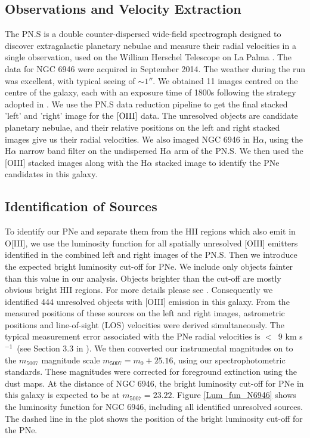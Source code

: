 \documentclass[fleqn,usenatbib]{mnras}
\newcommand{\kms}{km s$^{-1}$}
\begin{document}
\subsection{Observations and Velocity Extraction}  %
The PN.S is a double counter-dispersed wide-field spectrograph designed to discover extragalactic planetary nebulae and measure their radial velocities in a single observation, used on the William Herschel Telescope on La Palma \citep{douglas02}. 
The data for NGC 6946 were acquired in September 2014. The weather during the run was excellent, with typical seeing of $\sim 1''$.  We obtained 11 images centred on the centre of the galaxy, each with an exposure time of 1800s following the strategy adopted in . We use the PN.S data reduction pipeline \citep{Douglas:07} to get the final stacked 'left' and 'right' image for the 
$\rm [OIII]$ data. %
The unresolved objects are candidate planetary nebulae, and their relative positions on the left and right stacked images give us their radial velocities. %
We also imaged NGC 6946 in H$\alpha$, using the H$\alpha$  narrow band filter on the undispersed H$\alpha$ arm of the PN.S. We then used the [OIII] stacked images along with the H$\alpha$ stacked image to identify the PNe candidates in this galaxy. %


\subsection{Identification of Sources}
To identify our  %
PNe and separate them from the %
HII regions which also emit in O[III], we use the luminosity function for all spatially unresolved [OIII] emitters identified in the combined left and right images of the PN.S. Then we introduce the expected bright luminosity cut-off for PNe. We include only objects fainter than this value in our analysis. Objects brighter than the cut-off are mostly obvious bright HII regions. For more details please see . Consequently we identified 444 unresolved objects with [OIII] emission in this galaxy. From the measured positions of these sources on the left and right images, astrometric positions and line-of-sight (LOS) velocities were derived simultaneously. %
The typical measurement error associated with the PNe radial velocities is $<$~9 \kms\ (see Section 3.3 in ). 
We %
then converted our instrumental magnitudes %
on to the $m_{5007}$ magnitude scale $m_{5007} = m_{0} + 25.16$, using our spectrophotometric standards.  %
These magnitudes %
were corrected for foreground extinction using %
the \citet{Schlafly:2011} dust maps. %
At the distance of NGC 6946, the bright luminosity cut-off for PNe in this galaxy is expected to be at $m_{5007} = 23.22$. Figure \ref{Lum_fun_N6946} shows the luminosity function for NGC 6946, including all identified unresolved sources. The dashed line in the plot shows the position of the bright luminosity cut-off for the PNe. 
\end{document}
